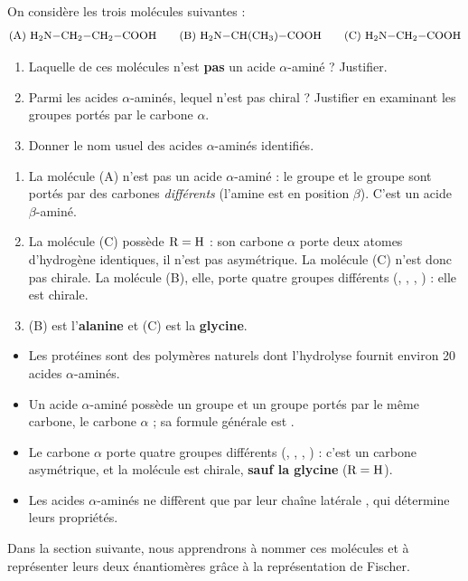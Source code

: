 \documentclass[11pt]{article}
\begin{document}
\begin{exercice}
On considère les trois molécules suivantes :
\[ \text{(A) } \ce{H2N-CH2-CH2-COOH} \qquad \text{(B) } \ce{H2N-CH(CH3)-COOH} \qquad \text{(C) } \ce{H2N-CH2-COOH} \]
\begin{enumerate}
\item Laquelle de ces molécules n'est \textbf{pas} un acide $\alpha$-aminé ? Justifier.
\item Parmi les acides $\alpha$-aminés, lequel n'est pas chiral ? Justifier en examinant les groupes portés par le carbone $\alpha$.
\item Donner le nom usuel des acides $\alpha$-aminés identifiés.
\end{enumerate}
\end{exercice}

\begin{corrige}
\begin{enumerate}
\item La molécule (A) n'est pas un acide $\alpha$-aminé : le groupe  et le groupe  sont portés par des carbones \emph{différents} (l'amine est en position $\beta$). C'est un acide $\beta$-aminé.
\item La molécule (C) possède $\ce{R} = \ce{H}$ : son carbone $\alpha$ porte deux atomes d'hydrogène identiques, il n'est pas asymétrique. La molécule (C) n'est donc pas chirale. La molécule (B), elle, porte quatre groupes différents (, , , ) : elle est chirale.
\item (B) est l'\textbf{alanine} et (C) est la \textbf{glycine}.
\end{enumerate}
\end{corrige}

\begin{aretenir}
\begin{itemize}
\item Les protéines sont des polymères naturels dont l'hydrolyse fournit environ 20 acides $\alpha$-aminés.
\item Un acide $\alpha$-aminé possède un groupe  et un groupe  portés par le même carbone, le carbone $\alpha$ ; sa formule générale est .
\item Le carbone $\alpha$ porte quatre groupes différents (, , , ) : c'est un carbone asymétrique, et la molécule est chirale, \textbf{sauf la glycine} ($\ce{R} = \ce{H}$).
\item Les acides $\alpha$-aminés ne diffèrent que par leur chaîne latérale , qui détermine leurs propriétés.
\end{itemize}
Dans la section suivante, nous apprendrons à nommer ces molécules et à représenter leurs deux énantiomères grâce à la représentation de Fischer.
\end{aretenir}
\end{document}
